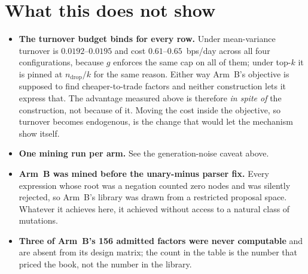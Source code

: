 \documentclass[11pt,a4paper]{article}
\begin{document}
\section{What this does not show}

\begin{itemize}\itemsep2pt\parskip0pt
  \item \textbf{The turnover budget binds for every row.} Under mean-variance
        turnover is $0.0192$--$0.0195$ and cost $0.61$--$0.65$~bps/day across all
        four configurations, because $g$ enforces the same cap on all of them;
        under top-$k$ it is pinned at $n_{\mathrm{drop}}/k$ for the same reason.
        Either way Arm~B's objective is supposed to find cheaper-to-trade
        factors and neither construction lets it express that. The advantage
        measured above is therefore \emph{in spite of} the construction, not
        because of it. Moving the cost inside the objective, so turnover becomes
        endogenous, is the change that would let the mechanism show itself.
  \item \textbf{One mining run per arm.} See the generation-noise caveat above.
  \item \textbf{Arm~B was mined before the unary-minus parser fix.} Every
        expression whose root was a negation counted zero nodes and was silently
        rejected, so Arm~B's library was drawn from a restricted proposal space.
        Whatever it achieves here, it achieved without access to a natural class
        of mutations.
  \item \textbf{Three of Arm~B's 156 admitted factors were never computable}
        and are absent from its design matrix; the count in the table is the
        number that priced the book, not the number in the library.
\end{itemize}
\end{document}
